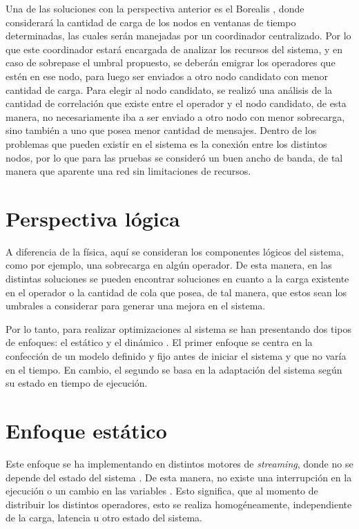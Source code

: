 Una de las soluciones con la perspectiva anterior es el Borealis \citep{XingZH05}, donde considerará la cantidad de carga de los nodos en ventanas de tiempo determinadas, las cuales serán manejadas por un coordinador centralizado. Por lo que este coordinador estará encargada de analizar los recursos del sistema, y en caso de sobrepase el umbral propuesto, se deberán emigrar los operadores que estén en ese nodo, para luego ser enviados a otro nodo candidato con menor cantidad de carga. Para elegir al nodo candidato, se realizó una análisis de la cantidad de correlación que existe entre el operador y el nodo candidato, de esta manera, no necesariamente iba a ser enviado a otro nodo con menor sobrecarga, sino también a uno que posea menor cantidad de mensajes. Dentro de los problemas que pueden existir en el sistema es la conexión entre los distintos nodos, por lo que para las pruebas se consideró un buen ancho de banda, de tal manera que aparente una red sin limitaciones de recursos.

\section{Perspectiva lógica}
A diferencia de la física, aquí se consideran los componentes lógicos del sistema, como por ejemplo, una sobrecarga en algún operador. De esta manera, en las distintas soluciones se pueden encontrar soluciones en cuanto a la carga existente en el operador o la cantidad de cola que posea, de tal manera, que estos sean los umbrales a considerar para generar una mejora en el sistema.


Por lo tanto, para realizar optimizaciones al sistema se han presentando dos tipos de enfoques: el estático y el dinámico \cite{Dong06schedulingalgorithms}. El primer enfoque se centra en la confección de un modelo definido y fijo antes de iniciar el sistema y que no varía en el tiempo. En cambio, el segundo se basa en la adaptación del sistema según su estado en tiempo de ejecución.

\section{Enfoque estático}

Este enfoque se ha implementando en distintos motores de \textsl{streaming}, donde no se depende del estado del sistema \citep{stormtwitter, s4}. De esta manera, no existe una interrupción en la ejecución o un cambio en las variables  \citep{CasavantK88}. Esto significa, que al momento de distribuir los distintos operadores, esto se realiza homogéneamente, independiente de la carga, latencia u otro estado del sistema.

